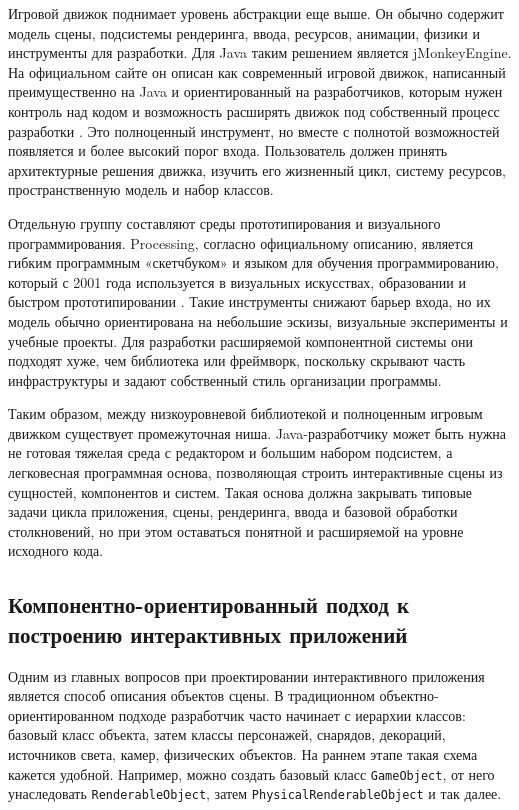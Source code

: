 Игровой движок поднимает уровень абстракции еще выше. Он обычно
содержит модель сцены, подсистемы рендеринга, ввода, ресурсов, анимации,
физики и инструменты для разработки. Для Java таким решением является
jMonkeyEngine. На официальном сайте он описан как современный игровой
движок, написанный преимущественно на Java и ориентированный на
разработчиков, которым нужен контроль над кодом и возможность расширять
движок под собственный процесс разработки \cite{jmonkeyengine}. Это
полноценный инструмент, но вместе с полнотой возможностей появляется и
более высокий порог входа. Пользователь должен принять архитектурные
решения движка, изучить его жизненный цикл, систему ресурсов,
пространственную модель и набор классов.

Отдельную группу составляют среды прототипирования и визуального
программирования. Processing, согласно официальному описанию, является
гибким программным «скетчбуком» и языком для обучения программированию,
который с 2001 года используется в визуальных искусствах, образовании и
быстром прототипировании \cite{processing}. Такие инструменты снижают
барьер входа, но их модель обычно ориентирована на небольшие эскизы,
визуальные эксперименты и учебные проекты. Для разработки расширяемой
компонентной системы они подходят хуже, чем библиотека или фреймворк,
поскольку скрывают часть инфраструктуры и задают собственный стиль
организации программы.

Таким образом, между низкоуровневой библиотекой и полноценным игровым
движком существует промежуточная ниша. Java-разработчику может быть
нужна не готовая тяжелая среда с редактором и большим набором подсистем, а
легковесная программная основа, позволяющая строить интерактивные сцены
из сущностей, компонентов и систем. Такая основа должна закрывать типовые
задачи цикла приложения, сцены, рендеринга, ввода и базовой обработки
столкновений, но при этом оставаться понятной и расширяемой на уровне
исходного кода.

\subsection{Компонентно-ориентированный подход к построению интерактивных приложений}

Одним из главных вопросов при проектировании интерактивного
приложения является способ описания объектов сцены. В традиционном
объектно-ориентированном подходе разработчик часто начинает с иерархии
классов: базовый класс объекта, затем классы персонажей, снарядов,
декораций, источников света, камер, физических объектов. На раннем этапе
такая схема кажется удобной. Например, можно создать базовый класс
\texttt{GameObject}, от него унаследовать \texttt{RenderableObject}, затем
\texttt{PhysicalRenderableObject} и так далее.

